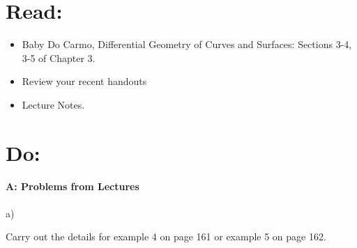 \documentclass[12pt]{article}
\title{\rightline {\Huge {Due: November, 8}}}
\author{\LARGE {HMC\quad Math 142 \quad Fall 2017} 
\\ {Prof. Gu}  
\\ {\LARGE Problem Set 8}}
\date{Start this assignment before Sunday night!}
\begin{document}
\maketitle

\section*{ Read: } 

\begin{itemize}
\item{Baby Do Carmo, Differential Geometry
    of Curves and Surfaces:  
Sections 3-4, 3-5 of Chapter 3.}
\item{ Review your recent handouts}
\item{Lecture Notes.}
\end{itemize}

\section*{ Do: }

\medskip
\paragraph{A: Problems from Lectures}

\begin{itemize}
{\item a)} Carry out the details for example 4 on page 161 or example 5 on page 162.
\end{itemize}
\end{document}
